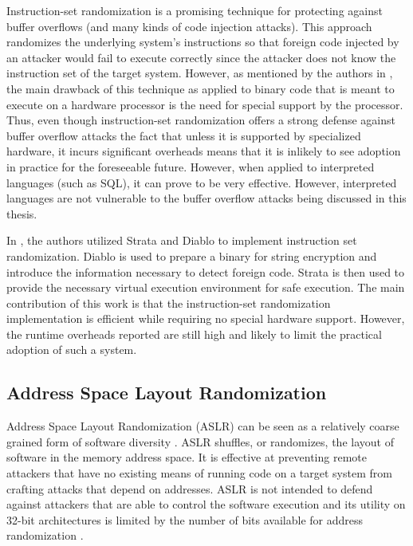 Instruction-set randomization \cite{isr} is a promising technique for protecting against buffer
overflows (and many kinds of code injection attacks). This approach randomizes the underlying
system's instructions so that foreign code injected by an attacker would fail to execute correctly
since the attacker does not know the instruction set of the target system. However, as mentioned by
the authors in \cite{isr}, the main drawback of this technique as applied to binary code that is meant
to execute on a hardware processor is the need for special support by the processor. Thus, even
though instruction-set randomization offers a strong defense against buffer overflow attacks the
fact that unless it is supported by specialized hardware, it incurs significant overheads means that
it is inlikely to see adoption in practice for the foreseeable future. However, when applied to
interpreted languages (such as SQL), it can prove to be very effective. However, interpreted
languages are not vulnerable to the buffer overflow attacks being discussed in this thesis.

In \cite{strata}, the authors utilized Strata and Diablo to implement instruction set randomization.
Diablo is used to prepare a binary for string encryption and introduce the information necessary to
detect foreign code. Strata is then used to provide the necessary virtual execution environment for
safe execution. The main contribution of this work is that the instruction-set randomization
implementation is efficient while requiring no special hardware support. However, the runtime
overheads reported are still high and likely to limit the practical adoption of such a system.

\subsection{Address Space Layout Randomization}

Address Space Layout Randomization (ASLR) can be seen as a relatively coarse grained form of
software diversity \cite{aslr}. ASLR shuffles, or randomizes, the layout of software in the memory
address space. It is effective at preventing remote attackers that have no existing means of running
code on a target system from crafting attacks that depend on addresses. ASLR is not intended to
defend against attackers that are able to control the software execution and its utility on 32-bit
architectures is limited by the number of bits available for address randomization \cite{aslr32}.

